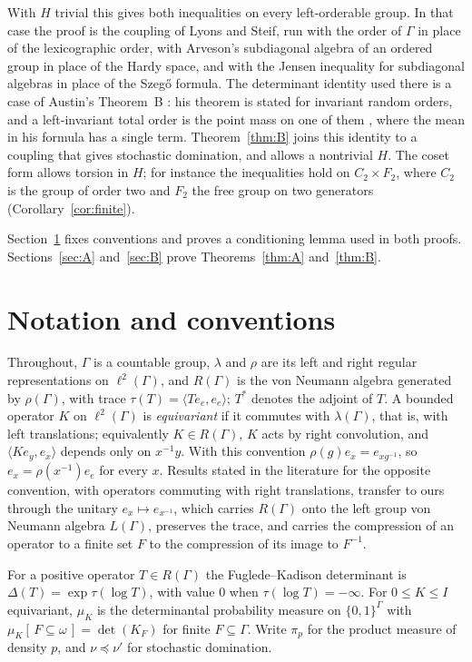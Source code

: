 \documentclass[11pt]{amsart}
\theoremstyle{remark}
\theoremstyle{definition}
\newcommand{\Ga}{\Gamma}
\newcommand{\FK}{\Delta}
\newcommand{\tr}{\tau}
\newcommand{\dom}{\preccurlyeq}
\newcommand{\ltwo}{\ell^2}
\begin{document}
With $H$ trivial
this gives both inequalities on every left-orderable group. In that case the proof is the coupling of Lyons and Steif,
run with the order of $\Ga$ in place of the lexicographic order, with Arveson's subdiagonal algebra of an ordered group
\cite{Arv67} in place of the Hardy space, and with the Jensen inequality for subdiagonal algebras
\cite{Lab05,BL} in place of the Szeg\H{o} formula. The determinant identity used there is a case of Austin's
Theorem~B \cite{Aus}: his theorem is stated for invariant random orders, and a left-invariant total order is the
point mass on one of them \cite[Sec.~4.1]{Aus}, where the mean in his formula has a single term. Theorem~\ref{thm:B}
joins this identity to a coupling that gives stochastic domination, and allows a nontrivial $H$. The coset form allows torsion in $H$; for instance the
inequalities hold on $C_2\times F_2$, where $C_2$ is the group of order two and $F_2$ the free group on two generators
(Corollary~\ref{cor:finite}).

Section~\ref{sec:notation} fixes conventions and proves a conditioning lemma used in both proofs. Sections~\ref{sec:A}
and~\ref{sec:B} prove Theorems~\ref{thm:A} and~\ref{thm:B}.

\section{Notation and conventions}\label{sec:notation}

Throughout, $\Ga$ is a countable group, $\lambda$ and $\rho$ are its left and right regular representations on
$\ltwo(\Ga)$, and $R(\Ga)$ is the von Neumann algebra generated by $\rho(\Ga)$, with trace
$\tr(T)=\langle Te_{e},e_{e}\rangle$; $T^*$ denotes the adjoint of $T$. A bounded operator $K$ on $\ltwo(\Ga)$ is \emph{equivariant} if it commutes with
$\lambda(\Ga)$, that is, with left translations; equivalently $K\in R(\Ga)$, $K$ acts by right convolution, and
$\langle Ke_y,e_x\rangle$ depends only on $x^{-1}y$.
With this convention $\rho(g)e_x=e_{xg^{-1}}$, so $e_x=\rho(x^{-1})e_e$ for every $x$. Results stated in the literature
for the opposite convention, with operators commuting with right translations, transfer to ours through the unitary
$e_x\mapsto e_{x^{-1}}$, which carries $R(\Ga)$ onto the left group von Neumann algebra $L(\Ga)$, preserves the trace,
and carries the compression of an operator to a finite set $F$ to the compression of its image to $F^{-1}$.

For a positive operator $T\in R(\Ga)$ the Fuglede--Kadison determinant is $\FK(T)=\exp\tr(\log T)$, with value $0$ when
$\tr(\log T)=-\infty$. For $0\le K\le I$ equivariant, $\mu_K$ is the determinantal probability measure on $\{0,1\}^{\Ga}$
with $\mu_K[\,F\subseteq\omega\,]=\det(K_F)$ for finite $F\subseteq\Ga$. Write $\pi_p$ for the product measure of density
$p$, and $\nu\dom\nu'$ for stochastic domination.
\end{document}
